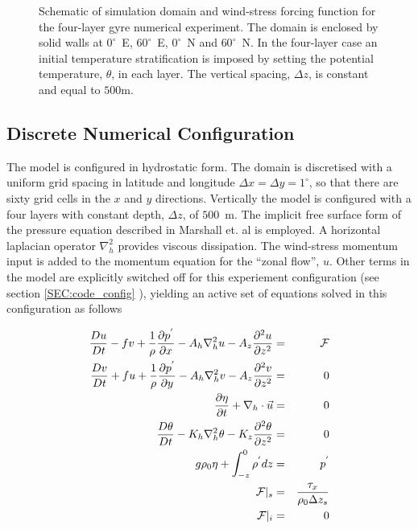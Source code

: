 \begin{figure}
\centerline{
}
\caption{Schematic of simulation domain and wind-stress forcing function 
for the four-layer gyre numerical experiment. The domain is enclosed by solid
walls at $0^{\circ}$~E, $60^{\circ}$~E, $0^{\circ}$~N and $60^{\circ}$~N.
In the four-layer case an initial temperature stratification is 
imposed by setting the potential temperature, $\theta$, in each layer.
The vertical spacing, $\Delta z$, is constant and equal to $500$m.
}
\label{FIG:simulation_config}
\end{figure}

\subsection{Discrete Numerical Configuration}

 The model is configured in hydrostatic form.  The domain is discretised with 
a uniform grid spacing in latitude and longitude
 $\Delta x=\Delta y=1^{\circ}$, so 
that there are sixty grid cells in the $x$ and $y$ directions. Vertically the 
model is configured with a four layers with constant depth, 
$\Delta z$, of $500$~m. 
The implicit free surface form of the 
pressure equation described in Marshall et. al \cite{Marshall97a} is 
employed. 
A horizontal laplacian operator $\nabla_{h}^2$ provides viscous
dissipation. The wind-stress momentum input is added to the momentum equation
for the ``zonal flow'', $u$. Other terms in the model
are explicitly switched off for this experiement configuration (see section
\ref{SEC:code_config} ), yielding an active set of equations solved in this 
configuration as follows

\begin{eqnarray}
\label{EQ:model_equations}
\frac{Du}{Dt} - fv + 
  \frac{1}{\rho}\frac{\partial p^{'}}{\partial x} - 
  A_{h}\nabla_{h}^2u - A_{z}\frac{\partial^{2}u}{\partial z^{2}} 
& = &
\cal{F}
\\
\frac{Dv}{Dt} + fu + 
  \frac{1}{\rho}\frac{\partial p^{'}}{\partial y} - 
  A_{h}\nabla_{h}^2v - A_{z}\frac{\partial^{2}v}{\partial z^{2}} 
& = &
0
\\
\frac{\partial \eta}{\partial t} + \nabla_{h}\cdot \vec{u}
&=&
0
\\
\frac{D\theta}{Dt} -
 K_{h}\nabla_{h}^2\theta  - K_{z}\frac{\partial^{2}\theta}{\partial z^{2}} 
& = &
0
\\
g\rho_{0} \eta + \int^{0}_{-z}\rho^{'} dz & = & p^{'}
\\
{\cal F} |_{s} & = & \frac{\tau_{x}}{\rho_{0}\Delta z_{s}}
\\
{\cal F} |_{i} & = & 0
\end{eqnarray}

